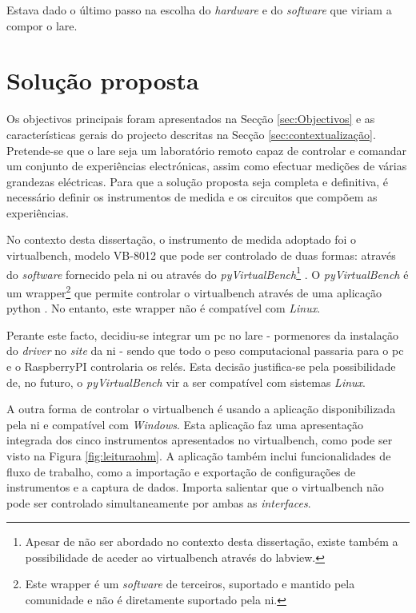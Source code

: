 Estava dado o último passo na escolha do \textit{hardware} e do \textit{software} que viriam a compor o \acrshort{lare}.

\section{Solução proposta}
\label{sec:solucaoproposta}
Os objectivos principais foram apresentados na Secção \ref{sec:Objectivos} e as características gerais do projecto descritas na Secção \ref{sec:contextualização}. Pretende-se que o \acrshort{lare} seja um \acrshort{laboratório remoto} capaz de controlar e comandar um conjunto de experiências electrónicas, assim como efectuar medições de várias grandezas eléctricas. Para que a solução proposta seja completa e definitiva, é necessário definir os instrumentos de medida e os circuitos que compõem as experiências.

No contexto desta dissertação, o instrumento de medida adoptado foi o \acrfull{virtualbench}, modelo VB-8012 que pode ser controlado de duas formas: através do \textit{software} fornecido pela \acrshort{ni} ou através do \textit{pyVirtualBench}\footnote{Apesar de não ser abordado no contexto desta dissertação, existe também a possibilidade de aceder ao \acrshort{virtualbench} através do \acrshort{labview}.} \cite{AutomatingVB}. O \textit{pyVirtualBench} é um \gls{wrapper}\footnote{Este \gls{wrapper} é um \textit{software} de terceiros, suportado e mantido pela comunidade e não é diretamente suportado pela \acrshort{ni}.} que permite controlar o \acrshort{virtualbench} através de uma aplicação \gls{python} \cite{pyvirtualbench}. No entanto, este \gls{wrapper} não é compatível com \textit{Linux}.

Perante este facto, decidiu-se integrar um \acrshort{pc} no \acrshort{lare} - pormenores da instalação do \textit{driver} no \textit{site} da \acrshort{ni} \cite{AutomatingVB} - sendo que todo o peso computacional passaria para o \acrshort{pc} e o \gls{RaspberryPI} controlaria os relés. Esta decisão justifica-se pela possibilidade de, no futuro, o \textit{pyVirtualBench} vir a ser compatível com sistemas \textit{Linux}.

A outra forma de controlar o \acrshort{virtualbench} é usando a aplicação disponibilizada pela \acrshort{ni}  e compatível com \textit{Windows}. Esta aplicação faz uma apresentação integrada dos cinco instrumentos apresentados no \acrshort{virtualbench}, como pode ser visto na Figura \ref{fig:leituraohm}. A aplicação também inclui funcionalidades de fluxo de trabalho, como a importação e exportação de configurações de instrumentos e a captura de dados. Importa salientar que o \acrshort{virtualbench} não pode ser controlado simultaneamente por ambas as \textit{interfaces}.

